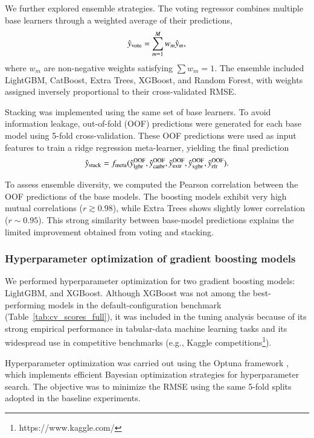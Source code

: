 \documentclass{aa}
\begin{document}
\begin{appendix}
We further explored ensemble strategies. The voting regressor combines multiple base learners through a weighted average of their predictions,
\begin{equation}
\hat{y}_{\rm vote} = \sum_{m=1}^{M} w_m \hat{y}_m ,
\end{equation}
where $w_m$ are non-negative weights satisfying $\sum w_m = 1$. The ensemble included LightGBM, CatBoost, Extra Trees, XGBoost, and Random Forest, with weights assigned inversely proportional to their cross-validated RMSE.

Stacking was implemented using the same set of base learners. To avoid information leakage, out-of-fold (OOF) predictions were generated for each base model using 5-fold cross-validation. These OOF predictions were used as input features to train a ridge regression meta-learner, yielding the final prediction
\begin{equation}
\hat{y}_{\rm stack} = f_{\rm meta}(\hat{y}_{\rm lgbr}^{\rm OOF},
\hat{y}_{\rm catbr}^{\rm OOF},
\hat{y}_{\rm extr}^{\rm OOF},
\hat{y}_{\rm xgbr}^{\rm OOF},
\hat{y}_{\rm rfr}^{\rm OOF}) .
\end{equation}

To assess ensemble diversity, we computed the Pearson correlation between the OOF predictions of the base models. The boosting models exhibit very high mutual correlations ($r \gtrsim 0.98$), while Extra Trees shows slightly lower correlation ($r \sim 0.95$). This strong similarity between base-model predictions explains the limited improvement obtained from voting and stacking.


\subsubsection{Hyperparameter optimization of gradient boosting models}

We performed hyperparameter optimization for two gradient boosting models: LightGBM, and XGBoost. Although XGBoost was not among the best-performing models in the default-configuration benchmark (Table~\ref{tab:cv_scores_full}), it was included in the tuning analysis because of its strong empirical performance in tabular-data machine learning tasks and its widespread use in competitive benchmarks (e.g., Kaggle competitions\footnote{https://www.kaggle.com/}).

Hyperparameter optimization was carried out using the Optuna framework \citep{Akiba-19}, which implements efficient Bayesian optimization strategies for hyperparameter search. The objective was to minimize the RMSE using the same 5-fold splits adopted in the baseline experiments.


\end{appendix}
\end{document}
